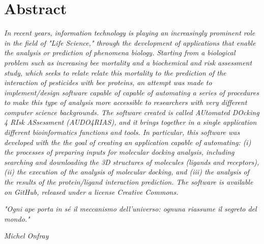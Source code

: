 \chapter*{\centering Abstract}
\pagestyle{plain}
\begin{adjustwidth}{25pt}{25pt}
\fontsize{18pt}{14pt}\selectfont
\textit{In recent years, information technology is playing an increasingly prominent role in the field of "Life Science," through the development of applications that enable the analysis or prediction of phenomena biology. Starting from a biological problem such as increasing bee mortality and a biochemical and risk assessment study, which seeks to relate relate this mortality to the prediction of the interaction of pesticides with bee proteins, an attempt was made to implement/design software capable of capable of automating a series of procedures to make this type of analysis more accessible to researchers with very different computer science backgrounds. The software created is called AUtomated DOcking 4 RIsk ASsessment (AUDO4RIAS), and it brings together in a single application different bioinformatics functions and tools. In particular, this software was developed with the the goal of creating an application capable of automating: (i) the processes of preparing inputs for molecular docking analysis, including searching and downloading the 3D structures of molecules (ligands and receptors), (ii) the execution of the analysis of molecular docking, and (iii) the analysis of the results of the protein/ligand interaction prediction. The software is available on GitHub, released under a license Creative Commons.}
\end{adjustwidth}
\newpage 
{\fontsize{18pt}{14pt}\selectfont
\emph{\newline
\newline
\newline
\newline
\newline
\newline
\newline
\newline
\newline
\newline
\newline
\newline
"Ogni ape porta in sé il meccanismo dell’universo: ognuna riassume il segreto del mondo."}

\begin{flushright}
    \emph{Michel Onfray}
\end{flushright}}
